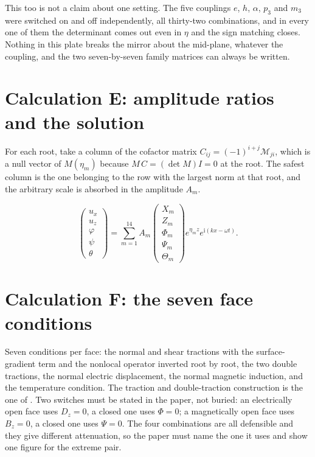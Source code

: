 \documentclass[11pt]{article}
\makeatletter
\newif\ifshowworked
\newenvironment{worked}{%
  \ifshowworked\par\smallskip\noindent\textit{Working.}\par\smallskip\else
  \setbox\z@\vbox\bgroup\fi}{\ifshowworked\par\smallskip\else\egroup\fi}
\newcommand{\ii}{\mathrm{i}}
\makeatother
\begin{document}
This too is not a claim about one setting. The five couplings $e$, $h$, $\alpha$, $p_3$ and $m_3$ were
switched on and off independently, all thirty-two combinations, and in every one of them the determinant
comes out even in $\eta$ and the sign matching closes. Nothing in this plate breaks the mirror about the
mid-plane, whatever the coupling, and the two seven-by-seven family matrices can always be written.

\section{Calculation E: amplitude ratios and the solution}\label{sec:calcE}

\begin{worked}
For each root, take a column of the cofactor matrix $C_{ij}=(-1)^{i+j}\mathcal M_{ji}$, which is a null
vector of $M(\eta_m)$ because $M\,C=(\det M)I=0$ at the root. The safest column is the one belonging to the
row with the largest norm at that root, and the arbitrary scale is absorbed in the amplitude $A_m$.
\end{worked}

\begin{equation}
\begin{pmatrix}u_x\\u_z\\\varphi\\\psi\\\theta\end{pmatrix}
=\sum_{m=1}^{14}A_m
\begin{pmatrix}X_m\\Z_m\\\Phi_m\\\Psi_m\\\Theta_m\end{pmatrix}
e^{\eta_mz}e^{\ii(kx-\omega t)} .
\end{equation}

\section{Calculation F: the seven face conditions}\label{sec:calcF}

\begin{worked}
Seven conditions per face: the normal and shear tractions with the surface-gradient term and the nonlocal
operator inverted root by root, the two double tractions, the normal electric displacement, the normal
magnetic induction, and the temperature condition. The traction and double-traction construction is the
one of \cite[Sec.~2, Eq.~(14)]{Charal2019}.
Two switches must be stated in the paper, not buried: an electrically open face uses $D_z=0$, a closed one
uses $\Phi=0$; a magnetically open face uses $B_z=0$, a closed one uses $\Psi=0$. The four combinations are
all defensible and they give different attenuation, so the paper must name the one it uses and show one
figure for the extreme pair.
\end{worked}
\end{document}
